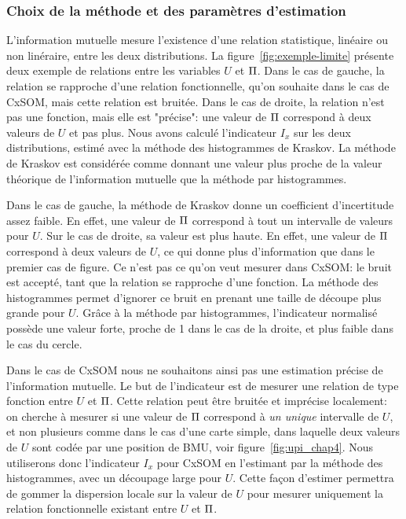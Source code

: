 \documentclass[../main]{subfiles}
\begin{document}
\subsubsection{Choix de la méthode et des paramètres d'estimation}

L'information mutuelle mesure l'existence d'une relation statistique, linéaire ou non linéraire, entre les deux distributions. La figure~\ref{fig:exemple-limite} présente deux exemple de relations entre les variables $U$ et $\Pi$.
Dans le cas de gauche, la relation se rapproche d'une relation fonctionnelle, qu'on souhaite dans le cas de CxSOM, mais cette relation est bruitée. Dans le cas de droite, la relation n'est pas une fonction, mais elle est "précise": une valeur de $\Pi$ correspond à deux valeurs de $U$ et pas plus.
Nous avons calculé l'indicateur $I_x$ sur les deux distributions, estimé avec la méthode des histogrammes de Kraskov. La méthode de Kraskov est considérée comme donnant une valeur plus proche de la valeur théorique de l'information mutuelle que la méthode par histogrammes. 

Dans le cas de gauche, la méthode de Kraskov donne un coefficient d'incertitude assez faible. En effet, une valeur de $\Pi$ correspond à tout un intervalle de valeurs pour $U$. Sur le cas de droite, sa valeur est plus haute. En effet, une valeur de $\Pi$ correspond à deux valeurs de $U$, ce qui donne plus d'information que dans le premier cas de figure. Ce n'est pas ce qu'on veut mesurer dans CxSOM: le bruit est accepté, tant que la relation se rapproche d'une fonction.
La méthode des histogrammes permet d'ignorer ce bruit en prenant une taille de découpe plus grande pour $U$. Grâce à la méthode par histogrammes, l'indicateur normalisé possède une valeur forte, proche de 1 dans le cas de la droite, et plus faible dans le cas du cercle.

Dans le cas de CxSOM nous ne souhaitons ainsi pas une estimation précise de l'information mutuelle.
Le but de l'indicateur est de mesurer une relation de type fonction entre $U$ et $\Pi$.
Cette relation peut être bruitée et imprécise localement: on cherche à mesurer si une valeur de $\Pi$ correspond à \emph{un unique} intervalle de $U$, et non plusieurs comme dans le cas d'une carte simple, dans laquelle deux valeurs de $U$ sont codée par une position de BMU, voir figure~\ref{fig:upi_chap4}.
Nous utiliserons donc l'indicateur $I_x$ pour CxSOM en l'estimant par la méthode des histogrammes, avec un découpage large pour $U$. Cette façon d'estimer permettra de gommer la dispersion locale sur la valeur de $U$ pour mesurer uniquement la relation fonctionnelle existant entre $U$ et $\Pi$.
\end{document}
